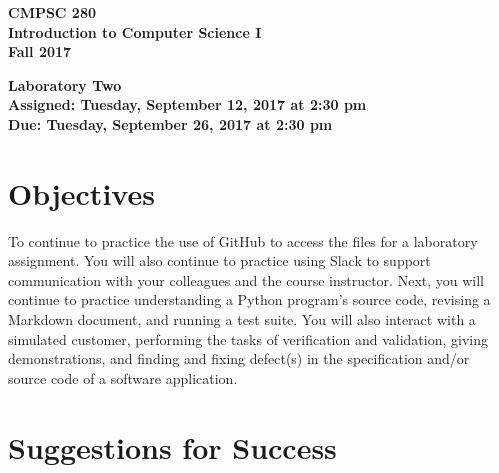 \documentclass[11pt]{article}
\newcommand{\assignmentduedate}{September 26}
\newcommand{\assignmentassignedate}{September 12}
\newcommand{\assignmentnumber}{Two}
\newcommand{\labyear}{2017}
\newcommand{\labday}{Tuesday}
\newcommand{\labtime}{2:30 pm}
\newcommand{\assigneddate}{Assigned: \labday, \assignmentassignedate, \labyear{} at \labtime{}}
\newcommand{\duedate}{Due: \labday, \assignmentduedate, \labyear{} at \labtime{}}
\newcommand{\labtitle}[1]
{
  \begin{center}
    \begin{center}
      \bf
      CMPSC 280\\Introduction to Computer Science I\\
      Fall 2017\\
      \medskip
    \end{center}
    \bf
    #1
  \end{center}
}
\begin{document}
\thispagestyle{empty}

\labtitle{Laboratory \assignmentnumber{} \\ \assigneddate{} \\ \duedate{}}

\section*{Objectives}

To continue to practice the use of GitHub to access the files for a laboratory assignment. You will also continue to
practice using Slack to support communication with your colleagues and the course instructor. Next, you will continue to
practice understanding a Python program's source code, revising a Markdown document, and running a test suite. You will
also interact with a simulated customer, performing the tasks of verification and validation, giving demonstrations, and
finding and fixing defect(s) in the specification and/or source code of a software application.

\section*{Suggestions for Success}
\end{document}
